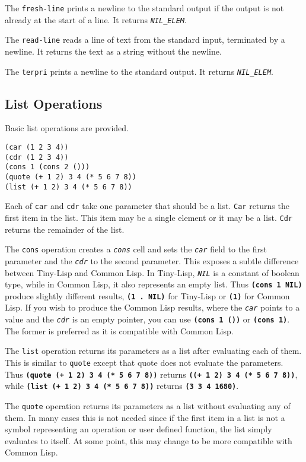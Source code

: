 \documentclass[10pt, openany]{book}
\newcommand{\operation}[1]{\textbf{\texttt{#1}}}
\newcommand{\function}[1]{\texttt{#1}}
\newcommand{\constant}[1]{\emph{\texttt{#1}}}
\newcommand{\tl}{Tiny-Lisp}
\newcommand{\cl}{Common Lisp}
\begin{document}
The \function{fresh-line} prints a newline to the standard output if the output is not already at the start of a line.  It returns \constant{NIL\_ELEM}.

The \function{read-line} reads a line of text from the standard input, terminated by a newline.  It returns the text as a string without the newline.

The \function{terpri} prints a newline to the standard output.  It returns \constant{NIL\_ELEM}.

\subsection{List Operations}
Basic list operations are provided.
\begin{lstlisting}
(car (1 2 3 4))
(cdr (1 2 3 4))
(cons 1 (cons 2 ()))
(quote (+ 1 2) 3 4 (* 5 6 7 8))
(list (+ 1 2) 3 4 (* 5 6 7 8))
\end{lstlisting}

Each of \function{car} and \function{cdr} take one parameter that should be a list.  \function{Car} returns the first item in the list.  This item may be a single element or it may be a list.  \function{Cdr} returns the remainder of the list.

The \function{cons} operation creates a \constant{cons} cell and sets the \constant{car} field to the first parameter and the \constant{cdr} to the second parameter.  This exposes a subtle difference between \tl{} and \cl.  In \tl, \constant{NIL} is a constant of boolean type, while in \cl, it also represents an empty list.  Thus \operation{(cons 1 NIL)} produce slightly different results, \operation{(1 . NIL)} for \tl{} or \operation{(1)} for \cl.  If you wish to produce the \cl{} results, where the \constant{car} points to a value and the \constant{cdr} is an empty pointer, you can use \operation{(cons 1 ())} or \operation{(cons 1)}.  The former is preferred as it is compatible with \cl.

The \function{list} operation returns its parameters as a list after evaluating each of them.  This is similar to \function{quote} except that quote does not evaluate the parameters.  Thus \operation{(quote (+ 1 2) 3 4 (* 5 6 7 8))} returns \operation{((+ 1 2) 3 4 (* 5 6 7 8))}, while \operation{(list (+ 1 2) 3 4 (* 5 6 7 8))} returns \operation{(3 3 4 1680)}.

The \function{quote} operation returns its parameters as a list without evaluating any of them.  In many cases this is not needed since if the first item in a list is not a symbol representing an operation or user defined function, the list simply evaluates to itself.  At some point, this may change to be more compatible with \cl.
\end{document}
